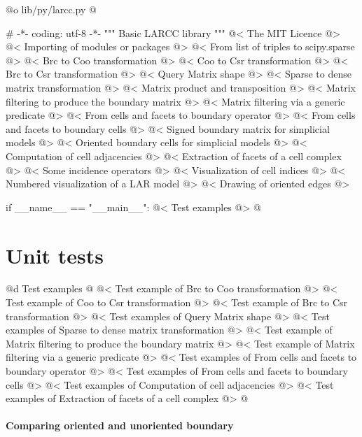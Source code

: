 \documentclass[11pt,oneside]{article}	%
\begin{document}
@o lib/py/larcc.py
@{# -*- coding: utf-8 -*-
""" Basic LARCC library """
@< The MIT Licence @>
@< Importing of modules or packages @>
@< From list of triples to scipy.sparse @>
@< Brc to Coo transformation @>
@< Coo to Csr transformation @>
@< Brc to Csr transformation @>
@< Query Matrix shape @>
@< Sparse to dense matrix transformation @>
@< Matrix product and transposition @>
@< Matrix filtering to produce the boundary matrix @>
@< Matrix filtering via a generic predicate @>
@< From cells and facets to boundary operator @>
@< From cells and facets to boundary cells @>
@< Signed boundary matrix for simplicial models @>
@< Oriented boundary cells for simplicial models @>
@< Computation of cell adjacencies @>
@< Extraction of facets of a cell complex @>
@< Some incidence operators @>
@< Visualization of cell indices @>
@< Numbered visualization of a LAR model @>
@< Drawing of oriented edges @>

if __name__ == "__main__": 
	@< Test examples @>
@}

\section{Unit tests}


@d Test examples
@{
@< Test example of Brc to Coo transformation @>
@< Test example of Coo to Csr transformation @>
@< Test example of Brc to Csr transformation @>
@< Test examples of Query Matrix shape @>
@< Test examples of Sparse to dense matrix transformation @>
@< Test example of Matrix filtering to produce the boundary matrix @>
@< Test example of Matrix filtering via a generic predicate @>
@< Test examples of From cells and facets to boundary operator @>
@< Test examples of From cells and facets to boundary cells @>
@< Test examples of Computation of cell adjacencies @>
@< Test examples of Extraction of facets of a cell complex @>
@}

\paragraph{Comparing oriented and unoriented boundary}
\end{document}
